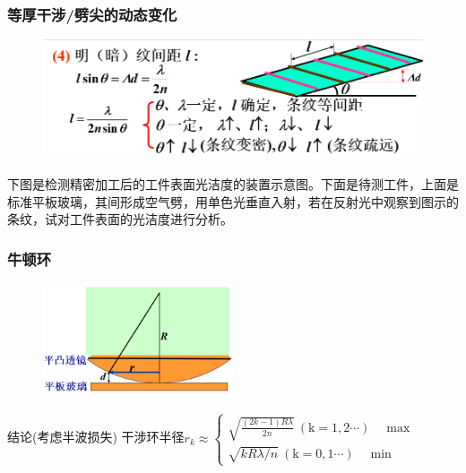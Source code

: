 \documentclass[UTF8]{ctexbeamer}
\begin{document}
\begin{frame}
	\frametitle{等厚干涉/劈尖的动态变化}
	\begin{figure}[!ht]
		\centering
		\includegraphics[width=1\textwidth]{19}
	\end{figure}
\end{frame}
\begin{examples}
	下图是检测精密加工后的工件表面光洁度的装置示意图。下面是待测工件，上面是标准平板玻璃，其间形成空气劈，用单色光垂直入射，若在反射光中观察到图示的条纹，试对工件表面的光洁度进行分析。
	\begin{figure}
		\centering
	\end{figure}
\end{examples}
\begin{frame}
\frametitle{牛顿环}
\begin{figure}[!ht]
	\centering
	\includegraphics[width=0.5\textwidth]{22}
\end{figure}
\begin{block}{结论(考虑半波损失)}
	干涉环半径$r_{{k}}\approx\begin{cases}
			\sqrt{\frac{(2k-1)R\lambda}{2n}}\mathrm{~(k=1,2\cdots)}\quad\max\\\sqrt{kR\lambda/n}\mathrm{~(k=0,1\cdots)}\quad\min
		\end{cases}$
\end{block}
\end{frame}
\end{document}
